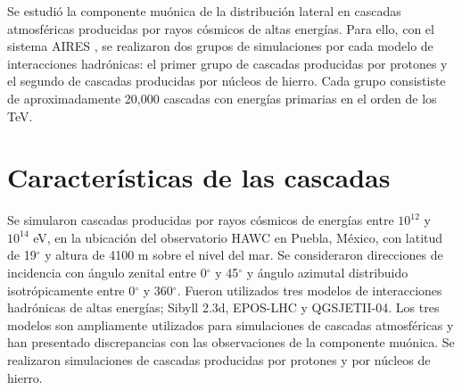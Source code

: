 Se estudi\'o la componente mu\'onica de la distribuci\'on lateral en cascadas atmosf\'ericas producidas por rayos c\'osmicos de altas energ\'ias. Para ello, con el sistema AIRES \cite{Sciutto1999a}, se realizaron dos grupos de simulaciones por cada modelo de interacciones hadr\'onicas: el primer grupo de cascadas producidas por protones y el segundo de cascadas producidas por n\'ucleos de hierro. Cada grupo consististe de aproximadamente 20,000 cascadas con energ\'ias primarias en el orden de los TeV.

\section{Características de las cascadas}
Se simularon cascadas producidas por rayos cósmicos de energías entre $10^{12}$ y $10^{14}$ eV, en la ubicaci\'on del observatorio HAWC en Puebla, M\'exico, con latitud de 19$^{\circ}$ y altura de 4100 m sobre el nivel del mar. Se consideraron direcciones de incidencia con ángulo zenital entre 0$^{\circ}$ y 45$^{\circ}$ y ángulo azimutal distribuido isotrópicamente entre 0$^{\circ}$ y 360$^{\circ}$. Fueron utilizados tres modelos de interacciones hadrónicas de altas energías; Sibyll 2.3d, EPOS-LHC y QGSJETII-04. Los tres modelos son ampliamente utilizados para simulaciones de cascadas atmosf\'ericas y han presentado discrepancias con las observaciones de la componente mu\'onica. Se realizaron simulaciones de cascadas producidas por protones y por n\'ucleos de hierro. \\
	 
